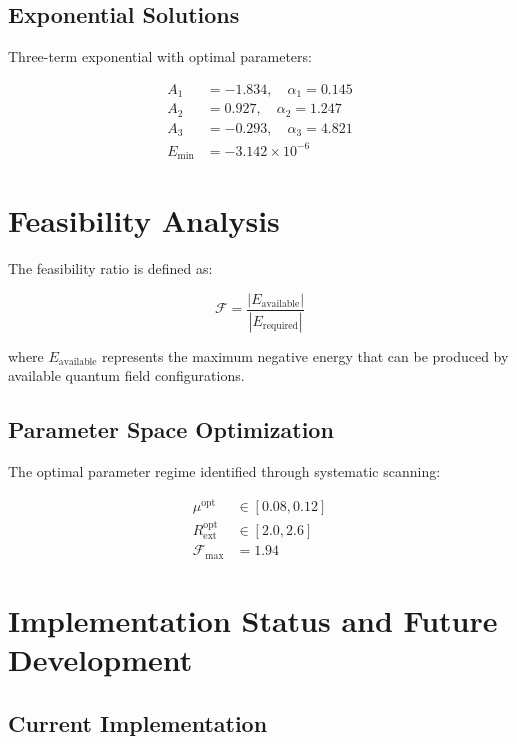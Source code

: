 \documentclass[12pt,a4paper]{article}
\begin{document}
\subsection{Exponential Solutions}

Three-term exponential with optimal parameters:

\begin{align}
A_1 &= -1.834, \quad \alpha_1 = 0.145 \\
A_2 &= 0.927, \quad \alpha_2 = 1.247 \\
A_3 &= -0.293, \quad \alpha_3 = 4.821 \\
E_{\text{min}} &= -3.142 \times 10^{-6}
\end{align}

\section{Feasibility Analysis}

The feasibility ratio is defined as:

\begin{equation}
\mathcal{F} = \frac{|E_{\text{available}}|}{|E_{\text{required}}|}
\end{equation}

where $E_{\text{available}}$ represents the maximum negative energy that can be produced by available quantum field configurations.

\subsection{Parameter Space Optimization}

The optimal parameter regime identified through systematic scanning:

\begin{align}
\mu^{\text{opt}} &\in [0.08, 0.12] \\
R_{\text{ext}}^{\text{opt}} &\in [2.0, 2.6] \\
\mathcal{F}_{\text{max}} &= 1.94
\end{align}

\section{Implementation Status and Future Development}

\subsection{Current Implementation}
\end{document}
